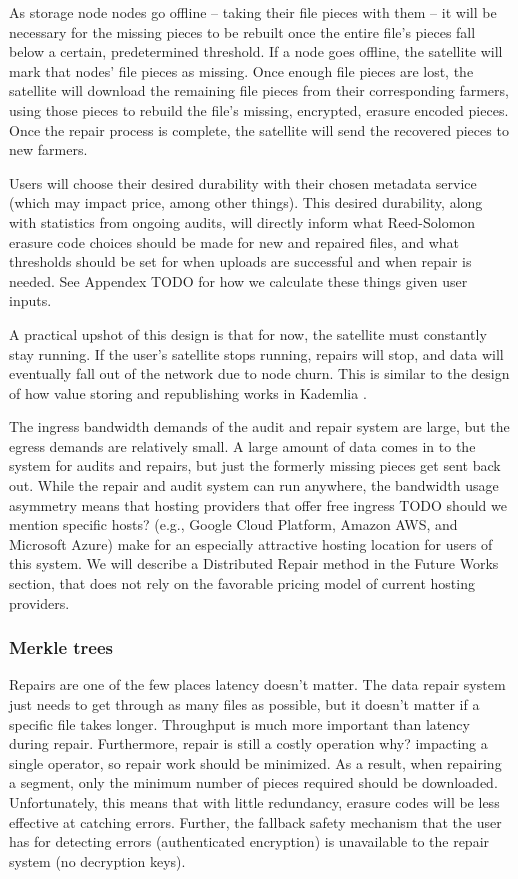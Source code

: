\documentclass[a4paper,10pt]{article} \usepackage[utf8]{inputenc}
\newcommand{\todo}[1]{{\color{red} TODO #1 }}
\newcommand{\bs}[1]{{\color{red}#1}}
\begin{document}
As storage node nodes go offline -- taking their file pieces with them -- 
it will be 
necessary for the missing pieces to be rebuilt once the entire file's pieces
fall below a certain, predetermined threshold. If a node goes offline, the
satellite will mark that nodes' file pieces as missing. 
Once enough file pieces are lost, the satellite will download the
remaining file pieces from their corresponding farmers, using those pieces 
to rebuild the file's missing, encrypted, erasure encoded pieces.
Once the repair process is complete, the satellite will send the
recovered pieces to new farmers.

Users will choose their desired durability with their chosen metadata service
(which may impact price, among other things). This desired durability, along 
with
statistics from ongoing audits, will directly inform what Reed-Solomon erasure
code choices should be made for new and repaired files, and what thresholds
should be set for when uploads are successful and when repair is needed. See
Appendex \todo{} for how we calculate these things given user inputs.

A practical upshot of this design is that for now, the satellite must
constantly stay running. If the user's satellite stops running, repairs will
stop, and data will eventually fall out of the network due to node churn. This
is similar to the design of how value storing and republishing works in
Kademlia \cite{kad}.

The ingress bandwidth demands of the audit and repair system are large, but the
egress demands are relatively small. A large amount of data comes in to the
system for audits and repairs, but just the formerly missing pieces get sent
back out.
While the repair and audit system can run anywhere, the bandwidth usage
asymmetry means that hosting providers
that offer free ingress \todo{should we mention specific hosts?
(e.g., Google Cloud Platform, Amazon AWS, and Microsoft Azure)}
make for an especially attractive hosting location for users of this system. We will describe a Distributed Repair method in the Future Works section, that does not rely on the favorable pricing model of current hosting providers. 

\subsubsection{Merkle trees}

Repairs are one of the few places latency doesn't matter. The data repair system
just needs to get through as many files as possible, but it doesn't matter if
a specific file takes longer. Throughput is much more important than
latency during repair. Furthermore, repair
is still a costly operation \bs{why?} impacting a single operator, so 
repair work should be minimized. 
As a result, when repairing a segment, 
only the minimum number of pieces required should be downloaded. 
Unfortunately, this means that
with little redundancy, erasure codes will be less effective at catching errors.
Further, the fallback safety mechanism that the user has for detecting errors
(authenticated encryption) is unavailable to the repair system (no decryption
keys).
\end{document}
